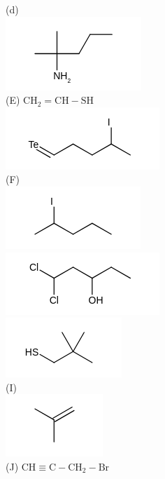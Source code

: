 \documentclass[10pt]{article}
\begin{document}
(d)\\
\includegraphics{smile-8b86d1b35a8887c828e4502a48f06d758c4c39b0}\\
(E) $\mathrm{CH}_{2}=\mathrm{CH}-\mathrm{SH}$\\
\includegraphics{smile-be04d28d93cd7454c8e0b64d6e1ec2e54c2ccca8}\\
(F)\\
\includegraphics{smile-f8f61f98a6ac685916cf5a4ae528cd1317358515}\\
\includegraphics{smile-cf2ffda34714bee445f49e6c8eec397290013e5e}\\
\includegraphics{smile-92a52992eceb141d4df7187eb0849cfe14f49cd2}\\
(I)\\
\includegraphics{smile-851bb8939d81b872a2ad82cdac194d2fd5f16e66}\\
(J) $\mathrm{CH} \equiv \mathrm{C}-\mathrm{CH}_{2}-\mathrm{Br}$\\
\end{document}
